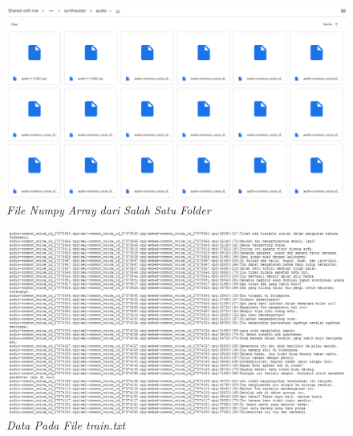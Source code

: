 \begin{enumerate}
\begin{figure}[H]
    \centering
    \includegraphics[scale=0.35]{figures/hasil14}
    \caption{\textit{File Numpy Array dari Salah Satu Folder}}
    \label{hasil14}
\end{figure}

\begin{figure}[H]
    \centering
    \includegraphics[scale=0.35]{figures/hasil15}
    \caption{\textit{Data Pada File train.txt}}
    \label{hasil15}
\end{figure}


\end{enumerate}

